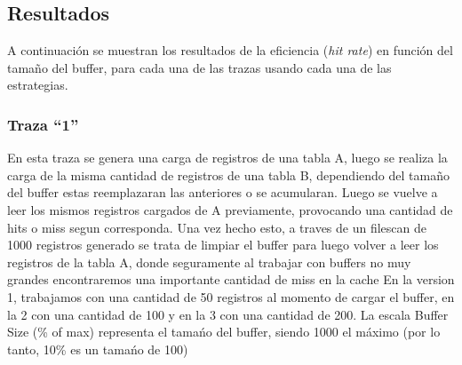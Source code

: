 \subsection{Resultados}
A continuaci\'on se muestran los resultados de la eficiencia (\textit{hit rate}) en funci\'on del tama\~no del buffer, para cada una de las trazas usando cada una de las
estrategias.

\subsubsection*{Traza ``1''}
En esta traza se genera una carga de registros de una tabla A, luego se realiza la carga de la misma cantidad de registros de una tabla B, dependiendo del tama\~no del buffer estas reemplazaran las anteriores o se acumularan. Luego se vuelve a leer los mismos registros cargados de A previamente, provocando una cantidad de hits o miss segun corresponda.
Una vez hecho esto, a traves de un filescan de 1000 registros generado se trata de limpiar el buffer para luego volver a leer los registros de la tabla A, donde seguramente al trabajar con buffers no muy grandes encontraremos una importante cantidad de miss en la cache
En la version 1, trabajamos con una cantidad de 50 registros al momento de cargar el buffer, en la 2 con una cantidad de 100 y en la 3 con una cantidad de 200. La escala Buffer Size (\% of max) representa el tama\'no del buffer, siendo 1000 el m\'aximo (por lo tanto, 10\% es un tama\'no de 100)

